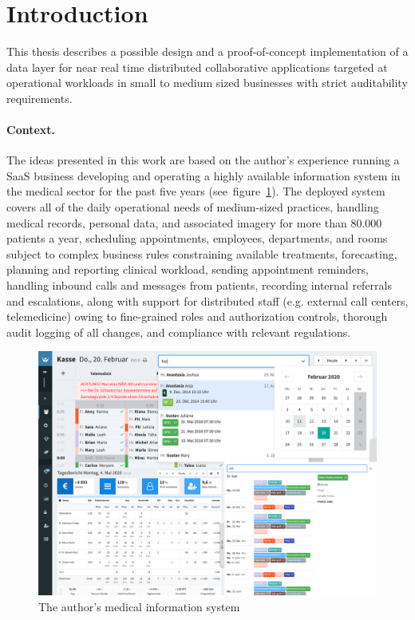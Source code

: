 \section{Introduction}

This thesis describes a possible design and a proof-of-concept implementation of a data layer for near real time distributed collaborative applications targeted at operational workloads in small to medium sized businesses with strict auditability requirements.

\paragraph{Context.} The ideas presented in this work are based on the author's experience running a \gls{SaaS} business developing and operating a highly available information system in the medical sector for the past five years (see~figure~\ref{fig:rosalind}). The deployed system covers all of the daily operational needs of medium-sized practices, handling medical records, personal data, and associated imagery for more than 80.000 patients a year, scheduling appointments, employees, departments, and rooms subject to complex business rules constraining available treatments, forecasting, planning and reporting clinical workload, sending appointment reminders, handling inbound calls and messages from patients, recording internal referrals and escalations, along with support for distributed staff (e.g. external call centers, telemedicine) owing to fine-grained roles and authorization controls, thorough audit logging of all changes, and compliance with relevant regulations.

\begin{figure}[!ht]
  \includegraphics[width=\linewidth]{images/rosalind.png}
  \caption{The author's medical information system}
  \label{fig:rosalind}
\end{figure}


